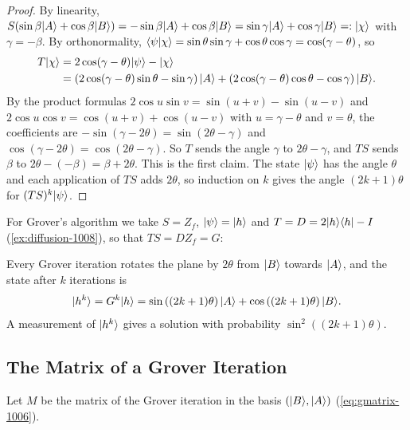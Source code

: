 \begin{proof}
    By linearity, $S(\sin\beta \lvert A \rangle + \cos\beta \lvert B \rangle) = -\sin\beta \lvert A \rangle + \cos\beta \lvert B \rangle
        = \sin\gamma \lvert A \rangle + \cos\gamma \lvert B \rangle =: \lvert \chi \rangle$ with $\gamma = -\beta$. By orthonormality,
    $\langle \psi \vert \chi \rangle = \sin\theta\sin\gamma + \cos\theta\cos\gamma = \cos(\gamma - \theta)$, so
    \begin{align*}
        T\lvert \chi \rangle & = 2\cos(\gamma - \theta)\lvert \psi \rangle - \lvert \chi \rangle                                     \\
                    & = \left(2\cos(\gamma - \theta)\sin\theta - \sin\gamma\right)\lvert A \rangle
        + \left(2\cos(\gamma - \theta)\cos\theta - \cos\gamma\right)\lvert B \rangle.
    \end{align*}
    By the product formulas $2\cos u \sin v = \sin(u + v) - \sin(u - v)$ and
    $2\cos u \cos v = \cos(u + v) + \cos(u - v)$ with $u = \gamma - \theta$ and $v = \theta$, the
    coefficients are $-\sin(\gamma - 2\theta) = \sin(2\theta - \gamma)$ and
    $\cos(\gamma - 2\theta) = \cos(2\theta - \gamma)$. So $T$ sends the angle $\gamma$ to
    $2\theta - \gamma$, and $TS$ sends $\beta$ to $2\theta - (-\beta) = \beta + 2\theta$. This is the
    first claim. The state $\lvert \psi \rangle$ has the angle $\theta$ and each application of $TS$ adds
    $2\theta$, so induction on $k$ gives the angle $(2k+1)\theta$ for $(TS)^k\lvert \psi \rangle$.
\end{proof}

For Grover's algorithm we take $S = Z_f$, $\lvert \psi \rangle = \lvert h \rangle$ and $T = D = 2\lvert h \rangle\langle h \rvert - I$
(\cref{ex:diffusion-1008}), so that $TS = D Z_f = G$:

\begin{corollary}\label{cor:hk-1008}
    Every Grover iteration rotates the plane by $2\theta$ from $\lvert B \rangle$ towards $\lvert A \rangle$, and the
    state after $k$ iterations is
    \[\lvert h^k \rangle = G^k\lvert h \rangle = \sin\left((2k+1)\theta\right) \lvert A \rangle + \cos\left((2k+1)\theta\right) \lvert B \rangle.\]
    A measurement of $\lvert h^k \rangle$ gives a solution with probability $\sin^2\left((2k+1)\theta\right)$.
\end{corollary}

\subsection{The Matrix of a Grover Iteration}

Let $M$ be the matrix of the Grover iteration in the basis $(\lvert B \rangle, \lvert A \rangle)$
(\cref{eq:gmatrix-1006}).

